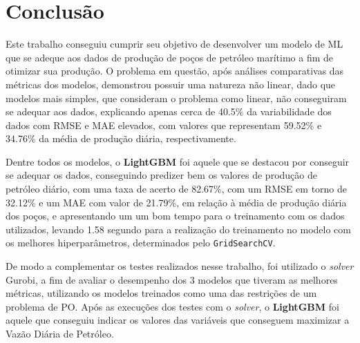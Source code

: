 \chapter{Conclusão}
\label{cap:conclusao}

Este trabalho conseguiu cumprir seu objetivo de desenvolver um modelo de \gls{ML} que se adeque aos dados de produção de poços de petróleo marítimo a fim de otimizar sua produção. O problema em questão, após análises comparativas das métricas dos modelos, demonstrou possuir uma natureza não linear, dado que modelos mais simples, que consideram o problema como linear, não conseguiram se adequar aos dados, explicando apenas cerca de 40.5\% da variabilidade dos dados com \gls{RMSE} e \gls{MAE} elevados, com valores que representam 59.52\% e 34.76\% da média de produção diária, respectivamente.

Dentre todos os modelos, o \textbf{LightGBM} foi aquele que se destacou por conseguir se adequar os dados, conseguindo predizer bem os valores de produção de petróleo diário, com uma taxa de acerto de 82.67\%, com um \gls{RMSE} em torno de 32.12\% e um \gls{MAE} com valor de 21.79\%, em relação à média de produção diária dos poços, e apresentando um um bom tempo para o treinamento com os dados utilizados, levando 1.58 segundo para a realização do treinamento no modelo com os melhores hiperparâmetros, determinados pelo \texttt{GridSearchCV}.

De modo a complementar os testes realizados nesse trabalho, foi utilizado o \textit{solver} Gurobi, a fim de avaliar o desempenho dos 3 modelos que tiveram as melhores métricas, utilizando os modelos treinados como uma das restrições de um problema de \gls{PO}. Após as execuções dos testes com o \textit{solver}, o \textbf{LightGBM} foi aquele que conseguiu indicar os valores das variáveis que conseguem maximizar a Vazão Diária de Petróleo.